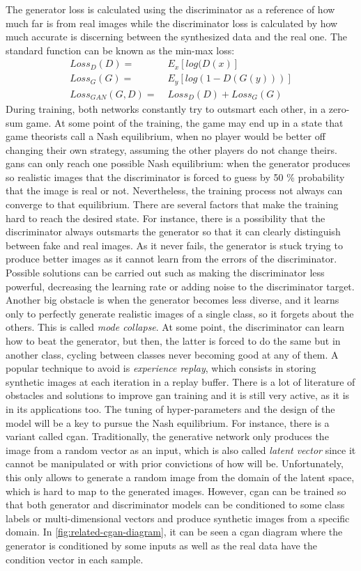 \documentclass[11pt, a4paper]{article}
\begin{document}
	The generator loss is calculated using the discriminator as a reference of how much far is from real images while the discriminator loss is calculated by how much accurate is discerning between the synthesized data and the real one. The standard function can be known as the min-max loss:
	\begin{align*}
		Loss_D(D) =& \; E_x[log(D(x)]\\
		Loss_G(G) =& \; E_y[log(1 - D(G(y)))]\\
		Loss_{GAN}(G, D) =&\; Loss_D(D) + Loss_G(G)
	\end{align*}
	During training, both networks constantly try to outsmart each
	other, in a zero-sum game. At some point of the training, the game may end up in a state that
	game theorists call a Nash equilibrium, when no player would be better off changing their own strategy, assuming the other players do not change theirs. \gls{gan}s can only reach one possible Nash equilibrium: when the generator produces so realistic images that the discriminator is forced to guess by 50 \% probability that the image is real or not. Nevertheless, the training process not always can converge to that equilibrium. There are several factors that make the training hard to reach the desired state. For instance, there is a possibility that the discriminator always outsmarts the generator so that it can clearly distinguish between fake and real images. As it never fails, the generator is stuck trying to produce better images as it cannot learn from the errors of the discriminator. Possible solutions can be carried out such as making the discriminator less powerful, decreasing the learning rate or adding noise to the discriminator target. Another big obstacle is when the generator becomes less diverse, and it learns only to perfectly generate realistic images of a single class, so it forgets about the others. This is  called \textit{mode collapse}. At some point, the discriminator can learn how to beat the generator, but then, the latter is forced to do the same but in another class, cycling between classes never becoming good at any of them. A popular technique to avoid is \textit{experience replay}, which consists in storing synthetic images at each iteration in a replay buffer. There is a lot of literature of obstacles and solutions to improve \gls{gan} training and it is still very active, as it is in its applications too. The tuning of hyper-parameters and the design of the model will be a key to pursue the Nash equilibrium. For instance, there is a variant called \gls{cgan}. Traditionally, the generative network only produces the image from a random vector as an input, which is also called \textit{latent vector} since it cannot be manipulated or with prior convictions of how will be. Unfortunately, this only allows to generate a random image from the domain of the latent space, which is hard to map to the generated images. However, \gls{cgan} can be trained so that both generator and discriminator models can be conditioned to some class labels or multi-dimensional vectors and produce synthetic images from a specific domain. In \ref{fig:related-cgan-diagram}, it can be seen a \gls{cgan} diagram where the generator is conditioned by some inputs as well as the real data have the condition vector in each sample.
\end{document}
